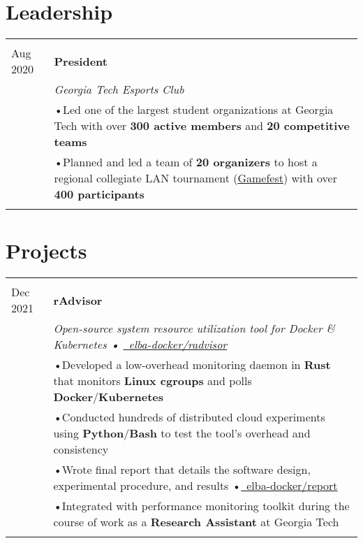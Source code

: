 \documentclass[a4paper,11pt]{article}
\newenvironment{rsection}[1]
  {
    \section{#1}
    \begin{tabular}{>{\raggedleft\arraybackslash}p{\lcolwidth}|p{\rcolwidth}}
   } {
    \\\multicolumn{2}{c}{} \\[-10pt]
    \end{tabular}
  }
\newcommand{\rheader}[2]{
    \multirow[t]{2}{*}{
        \begin{minipage}[t]{\dimexpr \lcolwidth - 0.1cm}
            \begin{flushright}
                \textsc{#1}
            \end{flushright}
        \end{minipage}
    } & \textbf{#2}
}
\newcommand{\rdesc}[1]{
  \\[-2pt]&\small{\emph{#1}\vspace{1pt} }
}
\newcommand{\ritem}[2][ •\hspace{3pt}]{\\[-2pt]& \footnotesize{#1#2}}
\newcommand{\rdot}{\xspace\hspace{0pt}•\hspace{3pt}\xspace}
\begin{document}
\begin{rsection}{Leadership}
  \rheader{July 2019 -\\[-1pt] Aug 2020}{President}
  \rdesc{Georgia Tech Esports Club}
  \ritem{Led one of the largest student organizations at Georgia Tech
    with over \textbf{300 active members} and \textbf{20 competitive teams}}
  \ritem{Planned and led a team of \textbf{20 organizers} to host a regional
    collegiate LAN tournament
    (\href{https://web.archive.org/web/20201111230854/https://gamefest.gg/}{Gamefest})
    with over \textbf{400 participants}}
\end{rsection}
\vspace{\sectionvspace}


\begin{rsection}{Projects}
  \rheader{Feb 2020 -\\[-1pt] Dec 2021}{rAdvisor}
  \rdesc{Open-source system resource utilization tool for Docker \& Kubernetes
    {\normalfont \rdot
    \href{https://github.com/elba-docker/radvisor}{\faGithub\ elba-docker/radvisor}}}
  \ritem{Developed a low-overhead monitoring daemon in \textbf{Rust}
    that monitors \textbf{Linux cgroups} and polls \textbf{Docker}/\textbf{Kubernetes}}
  \ritem{Conducted hundreds of distributed cloud experiments
    using \textbf{Python}/\textbf{Bash} to test the tool's overhead and consistency}
  \ritem{Wrote final report that details the software design, experimental procedure, and results
    \rdot \href{https://github.com/elba-docker/report}{\faGithub\ elba-docker/report}}
  \ritem{Integrated with performance monitoring toolkit during the course of work
    as a \textbf{Research Assistant} at Georgia Tech}
\end{rsection}
\end{document}
